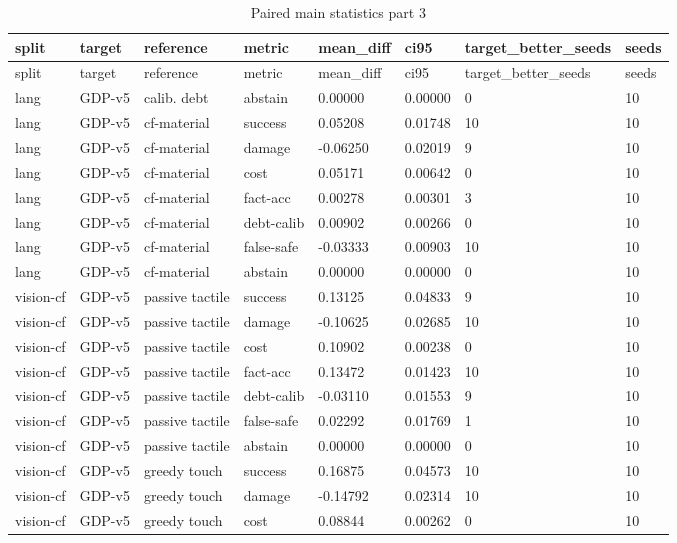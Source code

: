 \documentclass{article}
\begin{document}
\begin{center}
\tiny
\renewcommand{\arraystretch}{0.92}
\setlength{\tabcolsep}{3pt}
\begin{longtable}{llllllll}
\caption{Paired main statistics part 3}\label{tab:paired-main-statistics-3}\\
\toprule
split & target & reference & metric & mean\_diff & ci95 & target\_better\_seeds & seeds \\
\midrule
\endfirsthead
\toprule
split & target & reference & metric & mean\_diff & ci95 & target\_better\_seeds & seeds \\
\midrule
\endhead
lang & GDP-v5 & calib. debt & abstain & 0.00000 & 0.00000 & 0 & 10 \\
lang & GDP-v5 & cf-material & success & 0.05208 & 0.01748 & 10 & 10 \\
lang & GDP-v5 & cf-material & damage & -0.06250 & 0.02019 & 9 & 10 \\
lang & GDP-v5 & cf-material & cost & 0.05171 & 0.00642 & 0 & 10 \\
lang & GDP-v5 & cf-material & fact-acc & 0.00278 & 0.00301 & 3 & 10 \\
lang & GDP-v5 & cf-material & debt-calib & 0.00902 & 0.00266 & 0 & 10 \\
lang & GDP-v5 & cf-material & false-safe & -0.03333 & 0.00903 & 10 & 10 \\
lang & GDP-v5 & cf-material & abstain & 0.00000 & 0.00000 & 0 & 10 \\
vision-cf & GDP-v5 & passive tactile & success & 0.13125 & 0.04833 & 9 & 10 \\
vision-cf & GDP-v5 & passive tactile & damage & -0.10625 & 0.02685 & 10 & 10 \\
vision-cf & GDP-v5 & passive tactile & cost & 0.10902 & 0.00238 & 0 & 10 \\
vision-cf & GDP-v5 & passive tactile & fact-acc & 0.13472 & 0.01423 & 10 & 10 \\
vision-cf & GDP-v5 & passive tactile & debt-calib & -0.03110 & 0.01553 & 9 & 10 \\
vision-cf & GDP-v5 & passive tactile & false-safe & 0.02292 & 0.01769 & 1 & 10 \\
vision-cf & GDP-v5 & passive tactile & abstain & 0.00000 & 0.00000 & 0 & 10 \\
vision-cf & GDP-v5 & greedy touch & success & 0.16875 & 0.04573 & 10 & 10 \\
vision-cf & GDP-v5 & greedy touch & damage & -0.14792 & 0.02314 & 10 & 10 \\
vision-cf & GDP-v5 & greedy touch & cost & 0.08844 & 0.00262 & 0 & 10 \\

\end{longtable}
\end{center}
\end{document}
